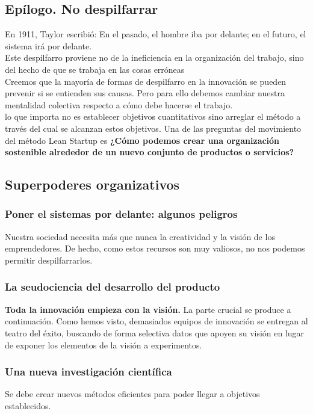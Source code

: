 \documentclass[10pt]{article}
\begin{document}
\begin{multicols}{2}
\section*{Epílogo. No despilfarrar}
En 1911, Taylor escribió: En el pasado, el hombre iba por delante; en el futuro, el sistema irá por delante.\\
{\color{blue}Este despilfarro proviene no de la ineficiencia en la organización del trabajo, sino del hecho de que se trabaja en las cosas erróneas}\\
Creemos que la mayoría de formas de despilfarro en la innovación se pueden prevenir si se entienden sus causas. Pero para ello debemos cambiar nuestra mentalidad colectiva respecto a cómo debe hacerse el trabajo. \\
{\color{red}lo que importa no es establecer objetivos cuantitativos sino arreglar el método a través del cual se alcanzan estos objetivos.} Una de las preguntas del movimiento del método Lean Startup es \textbf{¿Cómo podemos crear una organización sostenible alrededor de un nuevo conjunto de productos o servicios?}
\subsection*{Superpoderes organizativos}
\subsubsection*{Poner el sistemas por delante: algunos peligros}
Nuestra sociedad necesita más que nunca la creatividad y la visión de los emprendedores. De hecho, como estos recursos son muy valiosos, no nos podemos permitir despilfarrarlos.
\subsubsection*{La seudociencia del desarrollo del producto}
\textbf{Toda la innovación empieza con la visión.} La parte crucial se produce a continuación. Como hemos visto, demasiados equipos de innovación se entregan al teatro del éxito, buscando de forma selectiva datos que apoyen su visión en lugar de exponer los elementos de la visión a experimentos.\\
\subsubsection*{Una nueva investigación científica}
Se debe crear nuevos métodos eficientes para poder llegar a objetivos establecidos.


\end{multicols}
\end{document}
